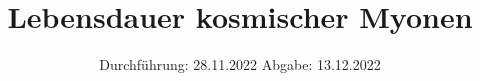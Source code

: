 

\subject{V01}
\title{Lebensdauer kosmischer Myonen}
\date{%
  Durchführung: 28.11.2022
  \hspace{3em}
  Abgabe: 13.12.2022
}



\maketitle
\setcounter{page}{1}







\printbibliography{}


